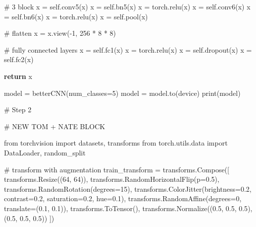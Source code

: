 \documentclass[
  letterpaper,
  DIV=11,
  numbers=noendperiod]{scrartcl}
\newenvironment{Shaded}{\begin{snugshade}}{\end{snugshade}}
\newcommand{\BuiltInTok}[1]{\textcolor[rgb]{0.00,0.23,0.31}{#1}}
\newcommand{\CommentTok}[1]{\textcolor[rgb]{0.37,0.37,0.37}{#1}}
\newcommand{\ControlFlowTok}[1]{\textcolor[rgb]{0.00,0.23,0.31}{\textbf{#1}}}
\newcommand{\DecValTok}[1]{\textcolor[rgb]{0.68,0.00,0.00}{#1}}
\newcommand{\FloatTok}[1]{\textcolor[rgb]{0.68,0.00,0.00}{#1}}
\newcommand{\ImportTok}[1]{\textcolor[rgb]{0.00,0.46,0.62}{#1}}
\newcommand{\NormalTok}[1]{\textcolor[rgb]{0.00,0.23,0.31}{#1}}
\newcommand{\OperatorTok}[1]{\textcolor[rgb]{0.37,0.37,0.37}{#1}}
\newcommand{\VariableTok}[1]{\textcolor[rgb]{0.07,0.07,0.07}{#1}}
\begin{document}
\begin{Shaded}
\begin{Highlighting}[]
        \CommentTok{\# 3 block}
\NormalTok{        x }\OperatorTok{=} \VariableTok{self}\NormalTok{.conv5(x)}
\NormalTok{        x }\OperatorTok{=} \VariableTok{self}\NormalTok{.bn5(x)}
\NormalTok{        x }\OperatorTok{=}\NormalTok{ torch.relu(x)}
\NormalTok{        x }\OperatorTok{=} \VariableTok{self}\NormalTok{.conv6(x)}
\NormalTok{        x }\OperatorTok{=} \VariableTok{self}\NormalTok{.bn6(x)}
\NormalTok{        x }\OperatorTok{=}\NormalTok{ torch.relu(x)}
\NormalTok{        x }\OperatorTok{=} \VariableTok{self}\NormalTok{.pool(x)}

        \CommentTok{\# flatten}
\NormalTok{        x }\OperatorTok{=}\NormalTok{ x.view(}\OperatorTok{{-}}\DecValTok{1}\NormalTok{, }\DecValTok{256} \OperatorTok{*} \DecValTok{8} \OperatorTok{*} \DecValTok{8}\NormalTok{)}

        \CommentTok{\# fully connected layers}
\NormalTok{        x }\OperatorTok{=} \VariableTok{self}\NormalTok{.fc1(x)}
\NormalTok{        x }\OperatorTok{=}\NormalTok{ torch.relu(x)}
\NormalTok{        x }\OperatorTok{=} \VariableTok{self}\NormalTok{.dropout(x)}
\NormalTok{        x }\OperatorTok{=} \VariableTok{self}\NormalTok{.fc2(x)}

        \ControlFlowTok{return}\NormalTok{ x}

\NormalTok{model }\OperatorTok{=}\NormalTok{ betterCNN(num\_classes}\OperatorTok{=}\DecValTok{5}\NormalTok{)}
\NormalTok{model }\OperatorTok{=}\NormalTok{ model.to(device)}
\BuiltInTok{print}\NormalTok{(model)}

\CommentTok{\# Step 2}

\CommentTok{\# NEW TOM + NATE BLOCK}

\ImportTok{from}\NormalTok{ torchvision }\ImportTok{import}\NormalTok{ datasets, transforms}
\ImportTok{from}\NormalTok{ torch.utils.data }\ImportTok{import}\NormalTok{ DataLoader, random\_split}

\CommentTok{\# transform with augmentation}
\NormalTok{train\_transform }\OperatorTok{=}\NormalTok{ transforms.Compose([}
\NormalTok{    transforms.Resize((}\DecValTok{64}\NormalTok{, }\DecValTok{64}\NormalTok{)),}
\NormalTok{    transforms.RandomHorizontalFlip(p}\OperatorTok{=}\FloatTok{0.5}\NormalTok{),}
\NormalTok{    transforms.RandomRotation(degrees}\OperatorTok{=}\DecValTok{15}\NormalTok{),}
\NormalTok{    transforms.ColorJitter(brightness}\OperatorTok{=}\FloatTok{0.2}\NormalTok{, contrast}\OperatorTok{=}\FloatTok{0.2}\NormalTok{, saturation}\OperatorTok{=}\FloatTok{0.2}\NormalTok{, hue}\OperatorTok{=}\FloatTok{0.1}\NormalTok{),}
\NormalTok{    transforms.RandomAffine(degrees}\OperatorTok{=}\DecValTok{0}\NormalTok{, translate}\OperatorTok{=}\NormalTok{(}\FloatTok{0.1}\NormalTok{, }\FloatTok{0.1}\NormalTok{)),}
\NormalTok{    transforms.ToTensor(),}
\NormalTok{    transforms.Normalize((}\FloatTok{0.5}\NormalTok{, }\FloatTok{0.5}\NormalTok{, }\FloatTok{0.5}\NormalTok{), (}\FloatTok{0.5}\NormalTok{, }\FloatTok{0.5}\NormalTok{, }\FloatTok{0.5}\NormalTok{))}
\NormalTok{])}


\end{Highlighting}
\end{Shaded}
\end{document}
